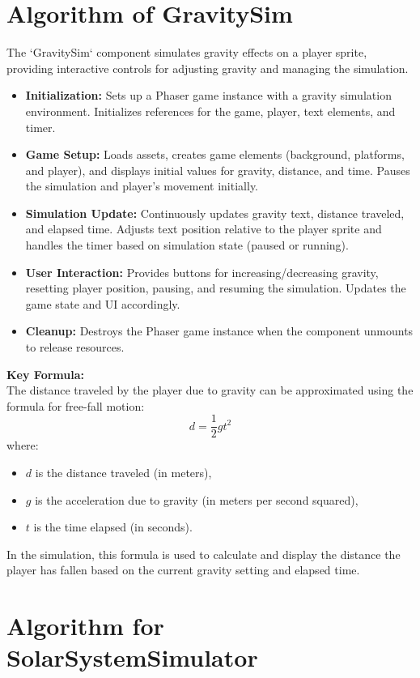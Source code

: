 \section{Algorithm of GravitySim}
The `GravitySim` component simulates gravity effects on a player sprite, providing interactive controls for adjusting gravity and managing the simulation.
\begin{itemize}
    \item \textbf{Initialization:} Sets up a Phaser game instance with a gravity simulation environment. Initializes references for the game, player, text elements, and timer.
    \item \textbf{Game Setup:} Loads assets, creates game elements (background, platforms, and player), and displays initial values for gravity, distance, and time. Pauses the simulation and player's movement initially.
    \item \textbf{Simulation Update:} Continuously updates gravity text, distance traveled, and elapsed time. Adjusts text position relative to the player sprite and handles the timer based on simulation state (paused or running).
    \item \textbf{User Interaction:} Provides buttons for increasing/decreasing gravity, resetting player position, pausing, and resuming the simulation. Updates the game state and UI accordingly.
    \item \textbf{Cleanup:} Destroys the Phaser game instance when the component unmounts to release resources.
\end{itemize}
\textbf{Key Formula:}\\
The distance traveled by the player due to gravity can be approximated using the formula for free-fall motion:
\[
d = \frac{1}{2} g t^2
\]
where:
\begin{itemize}
    \item \(d\) is the distance traveled (in meters),
    \item \(g\) is the acceleration due to gravity (in meters per second squared),
    \item \(t\) is the time elapsed (in seconds).
\end{itemize}
In the simulation, this formula is used to calculate and display the distance the player has fallen based on the current gravity setting and elapsed time.
\section{Algorithm for SolarSystemSimulator}

